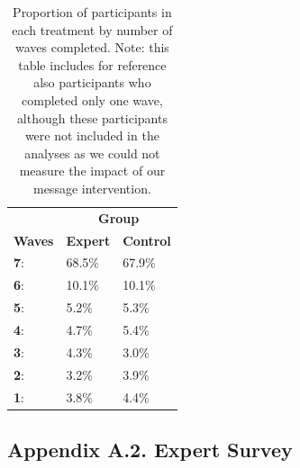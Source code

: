 \documentclass[authordate, empirical]{jote-new-article}
\begin{document}
\clearpage
\begin{table}[h!]
  \begin{fullwidth}
    \caption{Proportion of participants in each treatment by number of waves completed. Note: this table includes for reference also participants who completed only one wave, although these participants were not included in the analyses as we could not measure the impact of our message intervention.}
    \centering
    \begin{tabularx}{0.5\linewidth}{@{} X X X @{}}
                         & \multicolumn{2}{c}{\hspace*{-3em}\textbf{Group}}                    \\
      \textbf{Waves}     & \textbf{Expert}                                  & \textbf{Control} \\
      \hline \textbf{7}: & 68.5\%                                           & 67.9\%           \\

      \textbf{6}:        & 10.1\%                                           & 10.1\%           \\

      \textbf{5}:        & 5.2\%                                            & 5.3\%            \\

      \textbf{4}:        & 4.7\%                                            & 5.4\%            \\

      \textbf{3}:        & 4.3\%                                            & 3.0\%            \\

      \textbf{2}:        & 3.2\%                                            & 3.9\%            \\

      \textbf{1}:        & 3.8\%                                            & 4.4\%            \\
    \end{tabularx}
  \end{fullwidth}
\end{table}


\subsection{Appendix A.2. Expert Survey}
\end{document}
